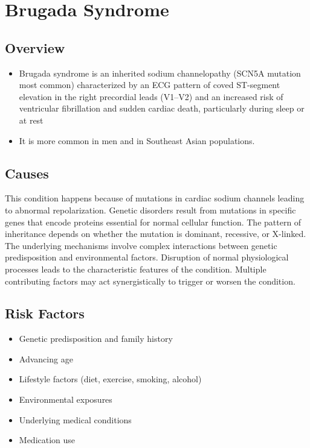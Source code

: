 \chapter{Brugada Syndrome}
\label{sec:Brugada Syndrome}

\section{Overview}


\begin{itemize}[noitemsep]
  \item Brugada syndrome is an inherited sodium channelopathy (SCN5A mutation most common) characterized by an ECG pattern of coved ST-segment elevation in the right precordial leads (V1--V2) and an increased risk of ventricular fibrillation and sudden cardiac death, particularly during sleep or at rest
  \item It is more common in men and in Southeast Asian populations.
\end{itemize}
\section{Causes}
This condition happens because of mutations in cardiac sodium channels leading to abnormal repolarization. Genetic disorders result from mutations in specific genes that encode proteins essential for normal cellular function. The pattern of inheritance depends on whether the mutation is dominant, recessive, or X-linked. The underlying mechanisms involve complex interactions between genetic predisposition and environmental factors. Disruption of normal physiological processes leads to the characteristic features of the condition. Multiple contributing factors may act synergistically to trigger or worsen the condition.
\section{Risk Factors}


\begin{itemize}[noitemsep]
  \item Genetic predisposition and family history
  \item Advancing age
  \item Lifestyle factors (diet, exercise, smoking, alcohol)
  \item Environmental exposures
  \item Underlying medical conditions
  \item Medication use
\end{itemize}
